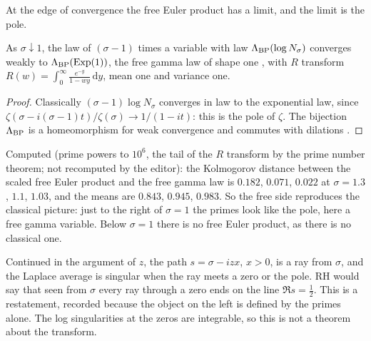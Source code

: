 At the edge of convergence the free Euler product has a limit, and the limit is the pole.
\begin{theorem}\label{bn:thm:fgamma}
As $\sigma\downarrow1$, the law of $(\sigma-1)$ times a variable with law $\Lambda_{\rm BP}(\log N_\sigma)$ converges weakly to $\Lambda_{\rm BP}(\mathrm{Exp}(1))$, the free gamma law of shape one \cite{HaagerupThorbjornsen14}, with $R$ transform $R(w)=\int_0^\infty\frac{e^{-y}}{1-wy}\,\mathrm dy$, mean one and variance one.
\end{theorem}
\begin{proof}
Classically $(\sigma-1)\log N_\sigma$ converges in law to the exponential law, since $\zeta(\sigma-i(\sigma-1)t)/\zeta(\sigma)\to1/(1-it)$: this is the pole of $\zeta$. The bijection $\Lambda_{\rm BP}$ is a homeomorphism for weak convergence and commutes with dilations \cite{BP99,BNT02}.
\end{proof}
\noindent Computed (prime powers to $10^6$, the tail of the $R$ transform by the prime number theorem; %
not recomputed by the editor): the Kolmogorov distance between the scaled free Euler product and the free gamma law is $0.182$, $0.071$, $0.022$ at $\sigma=1.3$, $1.1$, $1.03$, and the means are $0.843$, $0.945$, $0.983$. So the free side reproduces the classical picture: just to the right of $\sigma=1$ the primes look like the pole, here a free gamma variable. Below $\sigma=1$ there is no free Euler product, as there is no classical one.

\begin{remark}
Continued in the argument of $z$, the path $s=\sigma-izx$, $x>0$, is a ray from $\sigma$, and the Laplace average is singular when the ray meets a zero or the pole. RH would say that seen from $\sigma$ every ray through a zero ends on the line $\Re s=\frac12$. This is a restatement, recorded because the object on the left is defined by the primes alone. The log singularities at the zeros are integrable, so this is not a theorem about the transform.
\end{remark}


